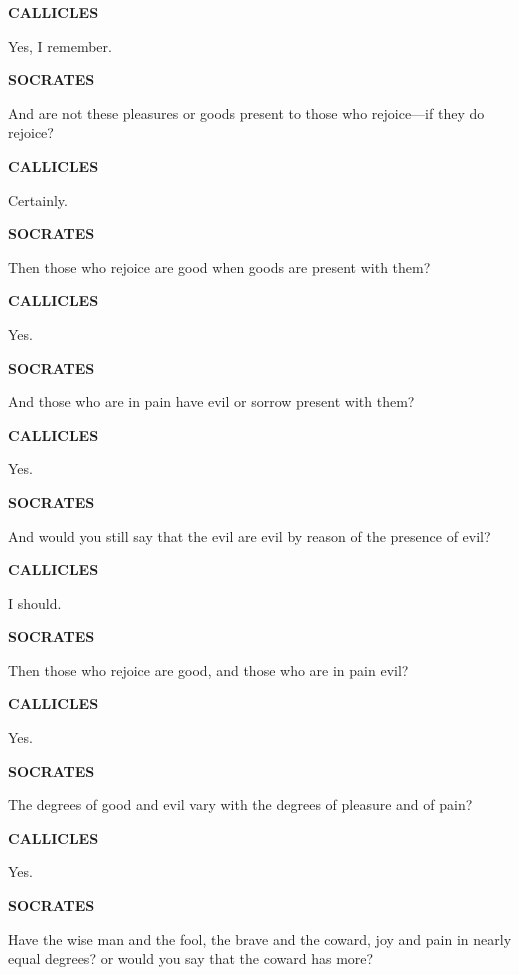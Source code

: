 \documentclass[11pt,letter]{article}
\begin{document}
\par \textbf{CALLICLES}
\par   Yes, I remember.

\par \textbf{SOCRATES}
\par   And are not these pleasures or goods present to those who rejoice—if they do rejoice?

\par \textbf{CALLICLES}
\par   Certainly.

\par \textbf{SOCRATES}
\par   Then those who rejoice are good when goods are present with them?

\par \textbf{CALLICLES}
\par   Yes.

\par \textbf{SOCRATES}
\par   And those who are in pain have evil or sorrow present with them?

\par \textbf{CALLICLES}
\par   Yes.

\par \textbf{SOCRATES}
\par   And would you still say that the evil are evil by reason of the presence of evil?

\par \textbf{CALLICLES}
\par   I should.

\par \textbf{SOCRATES}
\par   Then those who rejoice are good, and those who are in pain evil?

\par \textbf{CALLICLES}
\par   Yes.

\par \textbf{SOCRATES}
\par   The degrees of good and evil vary with the degrees of pleasure and of pain?

\par \textbf{CALLICLES}
\par   Yes.

\par \textbf{SOCRATES}
\par   Have the wise man and the fool, the brave and the coward, joy and pain in nearly equal degrees? or would you say that the coward has more?
\end{document}
